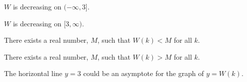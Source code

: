 \documentclass{ximera}
\begin{document}
\begin{exercise}
\begin{question}
$W$ is decreasing on $(-\infty, 3]$. \\


\begin{multipleChoice}
\end{multipleChoice}




$W$ is decreasing on $[3, \infty)$. \\


\begin{multipleChoice}
\end{multipleChoice}



\end{question}







\begin{question} 

There exists a real number, $M$, such that $W(k) < M$ for all $k$.
\begin{multipleChoice}
\end{multipleChoice}

\end{question}





\begin{question} 

There exists a real number, $M$, such that $W(k) > M$ for all $k$.
\begin{multipleChoice}
\end{multipleChoice}

\end{question}



\begin{question} 

The horizontal line $y = 3$ could be an asymptote for the graph of $y = W(k)$.
\begin{multipleChoice}
\end{multipleChoice}

\end{question}








\end{exercise}
\end{document}
